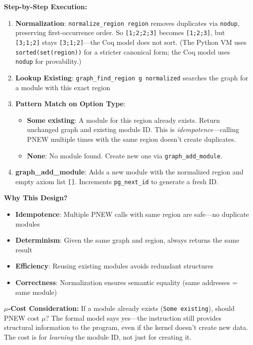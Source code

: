 \textbf{Step-by-Step Execution:}
\begin{enumerate}
    \item \textbf{Normalization}: \texttt{normalize\_region region} removes duplicates via \texttt{nodup}, preserving first-occurrence order. So \texttt{[1;2;2;3]} becomes \texttt{[1;2;3]}, but \texttt{[3;1;2]} stays \texttt{[3;1;2]}---the Coq model does not sort. (The Python VM uses \texttt{sorted(set(region))} for a stricter canonical form; the Coq model uses \texttt{nodup} for provability.)
    
    \item \textbf{Lookup Existing}: \texttt{graph\_find\_region g normalized} searches the graph for a module with this exact region
    
    \item \textbf{Pattern Match on Option Type}:
    \begin{itemize}
        \item \textbf{Some existing}: A module for this region already exists. Return unchanged graph and existing module ID. This is \emph{idempotence}—calling PNEW multiple times with the same region doesn't create duplicates.
        \item \textbf{None}: No module found. Create new one via \texttt{graph\_add\_module}.
    \end{itemize}
    
    \item \textbf{graph\_add\_module}: Adds a new module with the normalized region and empty axiom list \texttt{[]}. Increments \texttt{pg\_next\_id} to generate a fresh ID.
\end{enumerate}

\textbf{Why This Design?}
\begin{itemize}
    \item \textbf{Idempotence}: Multiple PNEW calls with same region are safe—no duplicate modules
    \item \textbf{Determinism}: Given the same graph and region, always returns the same result
    \item \textbf{Efficiency}: Reusing existing modules avoids redundant structures
    \item \textbf{Correctness}: Normalization ensures semantic equality (same addresses = same module)
\end{itemize}

\textbf{$\mu$-Cost Consideration:} If a module already exists (\texttt{Some existing}), should PNEW cost $\mu$? The formal model says yes—the instruction still provides structural information to the program, even if the kernel doesn't create new data. The cost is for \emph{learning} the module ID, not just for creating it.

